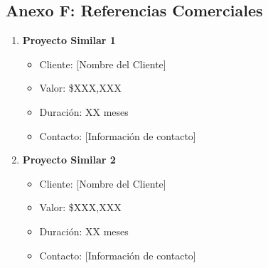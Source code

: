 \subsection{Anexo F: Referencias Comerciales}
\begin{enumerate}
    \item \textbf{Proyecto Similar 1}
    \begin{itemize}
        \item Cliente: [Nombre del Cliente]
        \item Valor: \$XXX,XXX
        \item Duración: XX meses
        \item Contacto: [Información de contacto]
    \end{itemize}
    
    \item \textbf{Proyecto Similar 2}
    \begin{itemize}
        \item Cliente: [Nombre del Cliente]
        \item Valor: \$XXX,XXX
        \item Duración: XX meses
        \item Contacto: [Información de contacto]
    \end{itemize}
\end{enumerate}